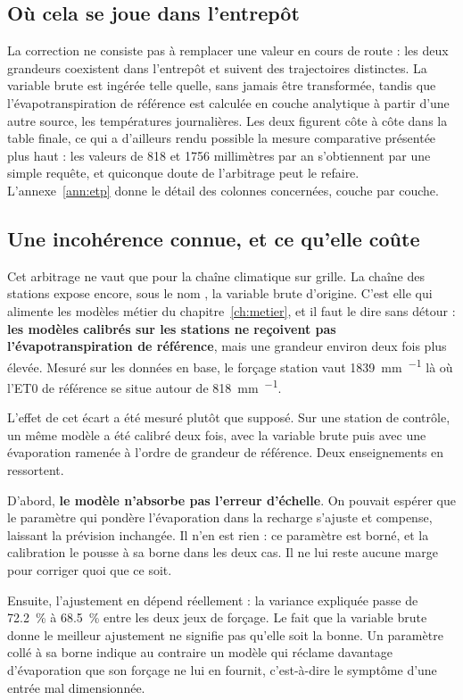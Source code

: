 \subsection{Où cela se joue dans l'entrepôt}

La correction ne consiste pas à remplacer une valeur en cours de route : les deux grandeurs
coexistent dans l'entrepôt et suivent des trajectoires distinctes. La variable brute est ingérée
telle quelle, sans jamais être transformée, tandis que l'évapotranspiration de référence est
calculée en couche analytique à partir d'une autre source, les températures journalières. Les
deux figurent côte à côte dans la table finale, ce qui a d'ailleurs rendu possible la mesure
comparative présentée plus haut : les valeurs de \num{818} et \num{1756} millimètres par an
s'obtiennent par une simple requête, et quiconque doute de l'arbitrage peut le refaire.
L'annexe~\ref{ann:etp} donne le détail des colonnes concernées, couche par couche.

\subsection{Une incohérence connue, et ce qu'elle coûte}

Cet arbitrage ne vaut que pour la chaîne climatique sur grille. La chaîne des stations expose
encore, sous le nom , la variable brute d'origine. C'est elle qui
alimente les modèles métier du chapitre~\ref{ch:metier}, et il faut le dire sans détour :
\textbf{les modèles calibrés sur les stations ne reçoivent pas l'évapotranspiration de
référence}, mais une grandeur environ deux fois plus élevée. Mesuré sur les données en base, le
forçage station vaut \SI{1839}{\milli\metre\per\an} là où l'ET0 de référence se situe autour de
\SI{818}{\milli\metre\per\an}.

L'effet de cet écart a été mesuré plutôt que supposé. Sur une station de contrôle, un même
modèle a été calibré deux fois, avec la variable brute puis avec une évaporation ramenée à
l'ordre de grandeur de référence. Deux enseignements en ressortent.

D'abord, \textbf{le modèle n'absorbe pas l'erreur d'échelle}. On pouvait espérer que le
paramètre qui pondère l'évaporation dans la recharge s'ajuste et compense, laissant la prévision
inchangée. Il n'en est rien : ce paramètre est borné, et la calibration le pousse à sa borne
dans les deux cas. Il ne lui reste aucune marge pour corriger quoi que ce soit.

Ensuite, l'ajustement en dépend réellement : la variance expliquée passe de \SI{72,2}{\percent}
à \SI{68,5}{\percent} entre les deux jeux de forçage. Le fait que la variable brute donne le
meilleur ajustement ne signifie pas qu'elle soit la bonne. Un paramètre collé à sa borne indique
au contraire un modèle qui réclame davantage d'évaporation que son forçage ne lui en fournit,
c'est-à-dire le symptôme d'une entrée mal dimensionnée.

